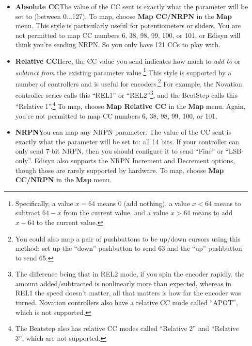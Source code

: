 \documentclass{article}
\begin{document}
\begin{itemize}
\item {\bf Absolute CC}\quad  The value of the CC sent is exactly what the parameter will be set to (between 0...127).  To map, choose {\bf Map CC/NRPN} in the {\bf Map} menu.  This style is particularly useful for potentiometers or sliders.  You are not permitted to map CC numbers 6, 38, 98, 99, 100, or 101, or Edisyn will think you're sending NRPN.  So you only have 121 CCs to play with.
\item {\bf Relative CC}\quad  Here, the CC value you send indicates how much to {\it add to} or {\it subtract from} the existing parameter value.\footnote{Specifically, a value \(x=64\) means 0 (add nothing), a value \(x<64\) means to subtract \(64-x\) from the current value, and a value \(x>64\) means to add \(x - 64\) to the current value.}  This style is supported by a number of controllers and is useful for encoders.\footnote{You could also map a pair of pushbuttons to be up/down cursors using this method: set up the ``down'' pushbutton to send 63 and the ``up'' pushbutton to send 65.}   For example, the Novation controller series calls this ``REL1'' or ``REL2''\footnote{The difference being that in REL2 mode, if you spin the encoder rapidly, the amount added/subtracted is nonlinearly more than expected, whereas in REL1 the speed doesn't matter, all that matters is how far the encoder was turned.  Novation controllers also have a relative CC mode called ``APOT'', which is not supported.}, and the BeatStep calls this ``Relative 1''.\footnote{The Beatstep also has relative CC modes called ``Relative 2'' and ``Relative 3'', which are not supported.}  To map, choose {\bf Map Relative CC} in the {\bf Map} menu.  Again, you're not permitted to map CC numbers 6, 38, 98, 99, 100, or 101.
\item {\bf NRPN}\quad You can map any NRPN parameter.  The value of the CC sent is exactly what the parameter will be set to: all 14 bits.  If your controller can only send 7-bit NRPN, then you should configure it to send ``Fine'' or ``LSB-only''.  Edisyn also supports the NRPN Increment and Decrement options, though those are rarely supported by hardware.  To  map, choose {\bf Map CC/NRPN} in the {\bf Map} menu.  
\end{itemize}
\end{document}
